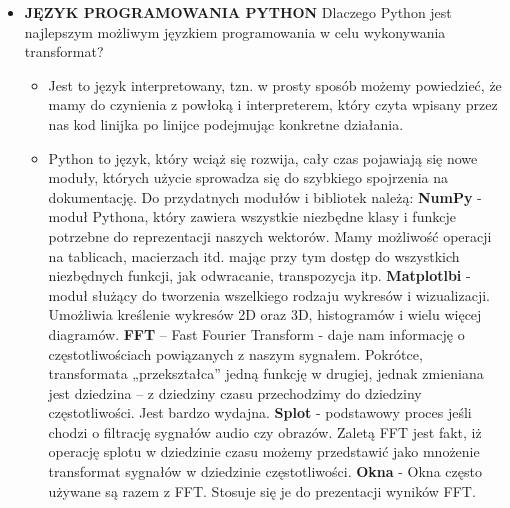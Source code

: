 \documentclass[a4paper,titleauthor]{mwart}
\begin{document}
\begin{itemize}
	\item \textbf{JĘZYK PROGRAMOWANIA PYTHON} \newline\newline
	Dlaczego Python jest najlepszym możliwym jęyzkiem programowania w celu wykonywania transformat?\newline
	\begin{itemize}
	\item Jest to język interpretowany, tzn. w prosty sposób możemy powiedzieć, że mamy do czynienia z powłoką i interpreterem, który czyta wpisany przez nas kod linijka po linijce podejmując konkretne działania.\newline
	\item Python to język, który wciąż się rozwija, cały czas pojawiają się nowe moduły, których użycie sprowadza się do szybkiego spojrzenia na dokumentację.\newline\newline
	Do przydatnych modułów i bibliotek należą:\newline\newline
	\textbf{NumPy} - moduł Pythona, który zawiera wszystkie niezbędne klasy i funkcje potrzebne do reprezentacji naszych wektorów. Mamy możliwość operacji na tablicach, macierzach itd. mając przy tym dostęp do wszystkich niezbędnych funkcji, jak odwracanie, transpozycja itp.\newline\newline
	\textbf{Matplotlbi} - moduł służący do tworzenia wszelkiego rodzaju wykresów i wizualizacji. Umożliwia kreślenie wykresów 2D oraz 3D, histogramów i wielu więcej diagramów.\newline\newline
	\textbf{FFT} – Fast Fourier Transform - daje nam informację o częstotliwościach powiązanych z naszym sygnałem. Pokrótce, transformata „przekształca” jedną funkcję w drugiej, jednak zmieniana jest dziedzina – z dziedziny czasu przechodzimy do dziedziny częstotliwości. Jest bardzo wydajna.\newline\newline
	\textbf{Splot} - podstawowy proces jeśli chodzi o filtrację sygnałów audio czy obrazów. Zaletą FFT jest fakt, iż operację splotu w dziedzinie czasu możemy przedstawić jako mnożenie transformat sygnałów w dziedzinie częstotliwości.\newline\newline
	\textbf{Okna} - Okna często używane są razem z FFT. Stosuje się je do prezentacji wyników FFT.\newline\newline
	\end{itemize}
	

\end{itemize}
\end{document}
